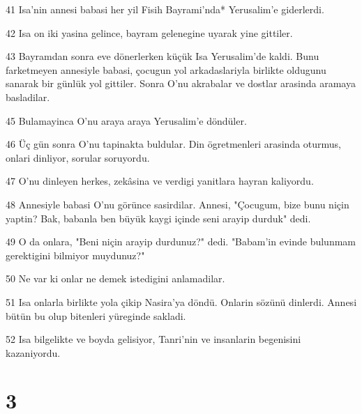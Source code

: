 \par 41 Isa'nin annesi babasi her yil Fisih Bayrami'nda* Yerusalim'e giderlerdi.
\par 42 Isa on iki yasina gelince, bayram gelenegine uyarak yine gittiler.
\par 43 Bayramdan sonra eve dönerlerken küçük Isa Yerusalim'de kaldi. Bunu farketmeyen annesiyle babasi, çocugun yol arkadaslariyla birlikte oldugunu sanarak bir günlük yol gittiler. Sonra O'nu akrabalar ve dostlar arasinda aramaya basladilar.
\par 45 Bulamayinca O'nu araya araya Yerusalim'e döndüler.
\par 46 Üç gün sonra O'nu tapinakta buldular. Din ögretmenleri arasinda oturmus, onlari dinliyor, sorular soruyordu.
\par 47 O'nu dinleyen herkes, zekâsina ve verdigi yanitlara hayran kaliyordu.
\par 48 Annesiyle babasi O'nu görünce sasirdilar. Annesi, "Çocugum, bize bunu niçin yaptin? Bak, babanla ben büyük kaygi içinde seni arayip durduk" dedi.
\par 49 O da onlara, "Beni niçin arayip durdunuz?" dedi. "Babam'in evinde bulunmam gerektigini bilmiyor muydunuz?"
\par 50 Ne var ki onlar ne demek istedigini anlamadilar.
\par 51 Isa onlarla birlikte yola çikip Nasira'ya döndü. Onlarin sözünü dinlerdi. Annesi bütün bu olup bitenleri yüreginde sakladi.
\par 52 Isa bilgelikte ve boyda gelisiyor, Tanri'nin ve insanlarin begenisini kazaniyordu.

\chapter{3}

